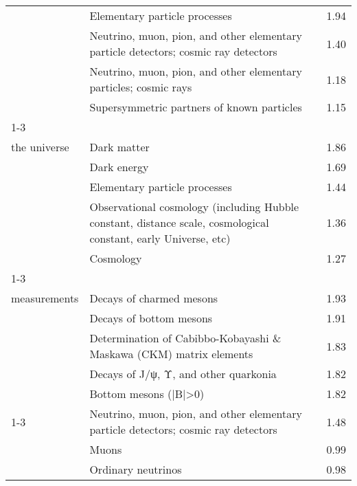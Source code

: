 \begin{longtable}[H]{p{}|p{}|p{}}
                                        & Elementary particle processes &  1.94 \\
                                        & Neutrino, muon, pion, and other elementary particle detectors; cosmic ray detectors &  1.40 \\
                                        & Neutrino, muon, pion, and other elementary particles; cosmic rays &  1.18 \\
                                        & Supersymmetric partners of known particles &  1.15 \\
\cline{1-3}
\multirow{5}{*}{\begin{tabular}{l}Dark matter in\\ the universe\end{tabular}} & Dark matter &  1.86 \\
                                        & Dark energy &  1.69 \\
                                        & Elementary particle processes &  1.44 \\
                                        & Observational cosmology (including Hubble constant, distance scale, cosmological constant, early Universe, etc) &  1.36 \\
                                        & Cosmology &  1.27 \\
\cline{1-3}
\multirow{5}{*}{\begin{tabular}{l}Decay\\ measurements\end{tabular}} & Decays of charmed mesons &  1.93 \\
                                        & Decays of bottom mesons &  1.91 \\
                                        & Determination of Cabibbo-Kobayashi \& Maskawa (CKM) matrix elements &  1.83 \\
                                        & Decays of J/ψ, Υ, and other quarkonia &  1.82 \\
                                        & Bottom mesons (|B|>0) &  1.82 \\
\cline{1-3}
\multirow{5}{*}{\begin{tabular}{l}Detectors\end{tabular}} & Neutrino, muon, pion, and other elementary particle detectors; cosmic ray detectors &  1.48 \\
                                        & Muons &  0.99 \\
                                        & Ordinary neutrinos &  0.98 \\

\end{longtable}
